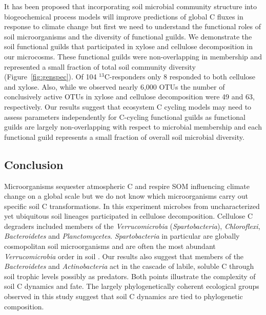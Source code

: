 It has been proposed that incorporating soil microbial community structure
into biogeochemical process models will improve predictions of global
C fluxes in response to climate change \citep{McGuire2010} but first we need to
understand the functional roles of soil microorganisms and the diversity of
functional guilds. We demonstrate the soil functional guilds that
participated in xylose and cellulose decomposition in our microcosms. These
functional guilds were non-overlapping in membership and represented a small
fraction of total soil community diversity (Figure~\ref{fig:genspec}). Of
104 $^{13}$C-responders only 8 responded to both cellulose and xylose.
Also, while we observed nearly 6,000 OTUs the number of conclusively active
OTUs in xylose and cellulose decomposition were 49 and 63, respectively. Our
results suggest that ecosystem C cycling models may need to assess parameters
independently for C-cycling functional guilds as functional guilds are largely
non-overlapping with respect to microbial membership and each functional guild
represents a small fraction of overall soil microbial diversity.

\subsection{Conclusion} 
Microorganisms sequester atmospheric C and respire SOM influencing climate change on a global scale but we do not
know which microorganisms carry out specific soil C transformations. In
this experiment microbes from uncharacterized yet ubiquitous soil lineages
participated in cellulose decomposition. Cellulose C degraders included
members of the \textit{Verrucomicrobia} (\textit{Spartobacteria}),
\textit{Chloroflexi}, \textit{Bacteroidetes} and \textit{Planctomycetes}.
\textit{Spartobacteria} in particular are globally cosmopolitan soil
microorganisms and are often the most abundant \textit{Verrucomicrobia}
order in soil \citep{Bergmann_2011}. Our results also suggest that
members of the \textit{Bacteroidetes} and \textit{Actinobacteria} act in
the cascade of labile, soluble C through soil trophic levels possibly as
predators. Both points illustrate the complexity of soil C dynamics and
fate. The largely phylogenetically coherent ecological groups observed in
this study suggest that soil C dynamics are tied to phylogenetic
composition.
